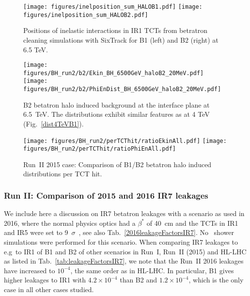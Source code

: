 \begin{figure}[!htb]
\begin{center}
\texttt{[image: figures/inelposition\_sum\_HALOB1.pdf]}
\texttt{[image: figures/inelposition\_sum\_HALOB2.pdf]}
\end{center}
 \caption{Positions of inelastic interactions in IR1 TCTs from betratron cleaning simulations with SixTrack for B1 (left) and B2 (right) at 6.5 TeV.
  \label{inel6.5}}
\end{figure}


\begin{figure}%
\centering
\texttt{[image: figures/BH\_run2/b2/Ekin\_BH\_6500GeV\_haloB2\_20MeV.pdf]}
\texttt{[image: figures/BH\_run2/b2/PhiEnDist\_BH\_6500GeV\_haloB2\_20MeV.pdf]}
 \caption{B2 betatron halo induced background at the interface plane at 6.5~TeV. The distributions exhibit similar features as at 4 TeV (Fig.~\ref{dist4TeVB1}).
  \label{dist6500GeVB2}}
\end{figure}


\begin{figure}%
\centering
  \texttt{[image: figures/BH\_run2/perTCThit/ratioEkinAll.pdf]}
  \texttt{[image: figures/BH\_run2/perTCThit/ratioPhiEnAll.pdf]}
 \caption{Run~II 2015 case: Comparison of B1/B2 betatron halo induced distributions per TCT hit.
  \label{compBHB1B2run2}}
\end{figure}

\subsubsection{Run II: Comparison of 2015 and 2016 IR7 leakages}

We include here a discussion on IR7 betatron leakages with a scenario as used in 2016, where the normal physics optics had a $\beta^*$ of 40~cm and the TCTs in IR1 and IR5 were set to 9~$\sigma$~\cite{bruceEvian2015}, see also Tab.~\ref{2016leakageFactorsIR7}. No \fluka~shower simulations were performed for this scenario. When comparing IR7 leakages to e.g~to IR1 of B1 and B2 of other scenarios in Run~I, Run~II (2015) and HL-LHC as listed in Tab.~\ref{tab:leakageFactorsIR7}, we note that the Run~II 2016 leakages have increased to $10^{-4}$, the same order as in HL-LHC. In particular, B1 gives higher leakages to IR1 with $4.2 \times 10^{-4}$ than B2 and $1.2 \times 10^{-4}$, which is the only case in all other cases studied.



